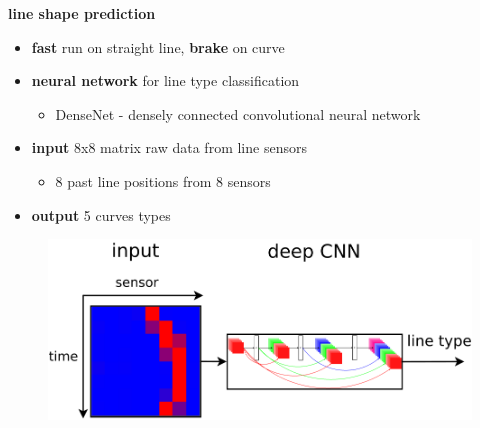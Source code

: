 \documentclass[xcolor=dvipsnames]{beamer}
\begin{document}
\begin{frame}{\bf line shape prediction}

\begin{itemize}
    \item {\bf fast} run on straight line, {\bf brake} on curve
    \item {\bf neural network} for line type classification
        \begin{itemize}
            \item DenseNet - densely connected convolutional neural network
        \end{itemize}
    \item {\bf input} 8x8 matrix raw data from line sensors
        \begin{itemize}
            \item 8 past line positions from 8 sensors
        \end{itemize}
    \item {\bf output} 5 curves types
\end{itemize}

\begin{figure}
    \includegraphics[scale=0.3]{../images/line_classification.png}
\end{figure}

\end{frame}
\end{document}
